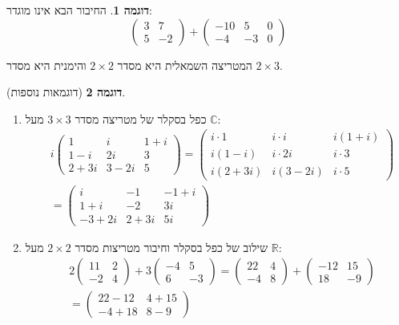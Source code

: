 \documentclass[12pt]{report}
\theoremstyle{plain}
\theoremstyle{definition}
\newtheorem{example}{דוגמה}[chapter]
\newcommand{\R}{\mathbb{R}}
\newcommand{\C}{\mathbb{C}}
\newcommand{\0}{\mathbf{0}}
\begin{document}
\begin{example}
    החיבור הבא אינו מוגדר:
$$
\begin{pmatrix} 3 & 7 \\
5 & -2 
\end{pmatrix}+\begin{pmatrix} -10 & 5 &0\\
-4 & -3 &0
\end{pmatrix}
$$

המטריצה השמאלית היא מסדר
$2\times 2$
והימנית היא מסדר
$2\times 3$.

\end{example}
\begin{example}[דוגמאות נוספות] \ 
\begin{enumerate}[label=\alph*.]


\item 

כפל בסקלר של מטריצה מסדר
$3\times 3$
מעל $\C$:
$$
\begin{aligned}
&i\begin{pmatrix} 1 & i & 1+i \\ 
1-i & 2i & 3 \\
2+3i & 3-2i & 5
\end{pmatrix}=\begin{pmatrix} i\cdot1 & i\cdot i & i(1+i) \\ 
i(1-i) & i\cdot 2i & i\cdot3 \\
i(2+3i) & i(3-2i) & i\cdot5
\end{pmatrix}\\
&=\begin{pmatrix}i & -1 & -1+i \\ 
1+i & -2 & 3i \\
-3+2i & 2+3i & 5i
\end{pmatrix}
\end{aligned}
$$


\item 
שילוב של כפל בסקלר וחיבור מטריצות מסדר
$2\times 2$
מעל $\R$:
$$
\begin{aligned}
&2 \begin{pmatrix} 11 & 2 \\
-2 & 4 
\end{pmatrix}+3\begin{pmatrix} -4 & 5 \\
6 & -3 
\end{pmatrix}=\begin{pmatrix} 22 & 4 \\
-4 & 8 
\end{pmatrix}+\begin{pmatrix} -12 & 15 \\
18 & -9 
\end{pmatrix}\\
&=\begin{pmatrix} 22-12 & 4+15 \\
-4+18 & 8-9 
\end{pmatrix}
\end{aligned}
$$


\end{enumerate}
\end{example}
\end{document}
